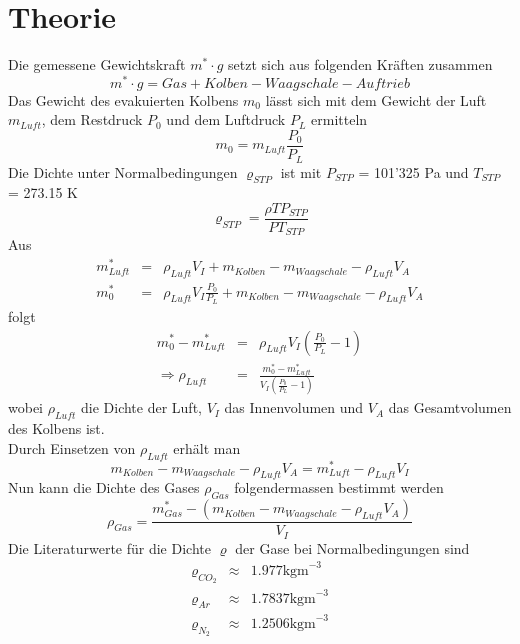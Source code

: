 \documentclass[12pt,a4paper]{article}
\begin{document}
\section*{Theorie}
Die gemessene Gewichtskraft $m^* \cdot g$ setzt sich aus folgenden Kr\"aften zusammen 
\begin{equation}
m^* \cdot g = Gas + Kolben - Waagschale - Auftrieb
\end{equation}
Das Gewicht des evakuierten Kolbens $m_0$ l\"asst sich mit dem Gewicht der Luft $m_{Luft}$, dem Restdruck $P_0$ und dem Luftdruck $P_L$ ermitteln
\begin{equation}
m_0 = m_{Luft} \frac{P_0}{P_L}
\end{equation}
Die Dichte unter Normalbedingungen $\varrho_{STP}$ ist mit $P_{STP}$ = 101'325 Pa und $T_{STP}$ = 273.15 K
\begin{equation}\label{eq:stp}
\varrho_{STP} = \frac{\rho T P_{STP}}{P T_{STP}}
\end{equation}
Aus
\begin{eqnarray}
m^*_{Luft} & = & \rho _{Luft} V_I + m_{Kolben} - m_{Waagschale} - \rho_{Luft} V_A \\
m^*_0 & = & \rho_{Luft} V_I \frac{P_0}{P_L} + m_{Kolben} - m_{Waagschale} - \rho_{Luft} V_A 
\end{eqnarray}
folgt
\begin{eqnarray}
m^*_0 - m^*_{Luft} & = & \rho_{Luft}V_I \left( \frac{P_0}{P_L}-1\right) \\
\Rightarrow \rho_{Luft} & = & \frac{m^*_0 - m^*_{Luft}}{V_I \left( \frac{P_0}{P_L}-1\right)}  \label{eq:rl}
\end{eqnarray}
wobei $\rho_{Luft}$ die Dichte der Luft, $V_I$ das Innenvolumen und $V_A$ das Gesamtvolumen des Kolbens ist. \\
Durch Einsetzen von $\rho_{Luft}$ erh\"alt man
\begin{equation}\label{eq:const}
m_{Kolben} - m_{Waagschale} - \rho_{Luft} V_A = m^*_{Luft} - \rho _{Luft} V_I
\end{equation}
Nun kann die Dichte des Gases $\rho_{Gas}$ folgendermassen bestimmt werden
\begin{equation}\label{eq:rg}
\rho _{Gas} = \frac{m^*_{Gas} - (m_{Kolben} - m_{Waagschale} - \rho_{Luft} V_A)}{V_I}
\end{equation}
Die Literaturwerte f\"ur die Dichte $\varrho$ der Gase bei Normalbedingungen sind
\begin{eqnarray}
\varrho_{CO_2} & \approx & 1.977 \mbox{kgm}^{-3}\\
\varrho_{Ar} & \approx & 1.7837  \mbox{kgm}^{-3}\\
\varrho_{N_2} & \approx & 1.2506  \mbox{kgm}^{-3}
\end{eqnarray}
\end{document}
